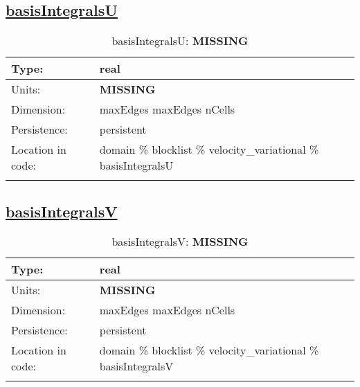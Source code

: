 \subsection[basisIntegralsU]{\hyperref[sec:var_tab_velocity_variational]{basisIntegralsU}}
\label{subsec:var_sec_velocity_variational_basisIntegralsU}
\begin{center}
\begin{longtable}{| p{2.0in} | p{4.0in} |}
        \hline 
        Type: & real \\
        \hline 
        Units: & {\bf \color{red} MISSING} \\
        \hline 
        Dimension: & maxEdges maxEdges nCells \\
        \hline 
        Persistence: & persistent \\
        \hline 
         Location in code: & domain \% blocklist \% velocity\_variational \% basisIntegralsU \\
         \hline 
    \caption{basisIntegralsU: {\bf \color{red} MISSING}}
\end{longtable}
\end{center}
\subsection[basisIntegralsV]{\hyperref[sec:var_tab_velocity_variational]{basisIntegralsV}}
\label{subsec:var_sec_velocity_variational_basisIntegralsV}
\begin{center}
\begin{longtable}{| p{2.0in} | p{4.0in} |}
        \hline 
        Type: & real \\
        \hline 
        Units: & {\bf \color{red} MISSING} \\
        \hline 
        Dimension: & maxEdges maxEdges nCells \\
        \hline 
        Persistence: & persistent \\
        \hline 
         Location in code: & domain \% blocklist \% velocity\_variational \% basisIntegralsV \\
         \hline 
    \caption{basisIntegralsV: {\bf \color{red} MISSING}}
\end{longtable}
\end{center}
